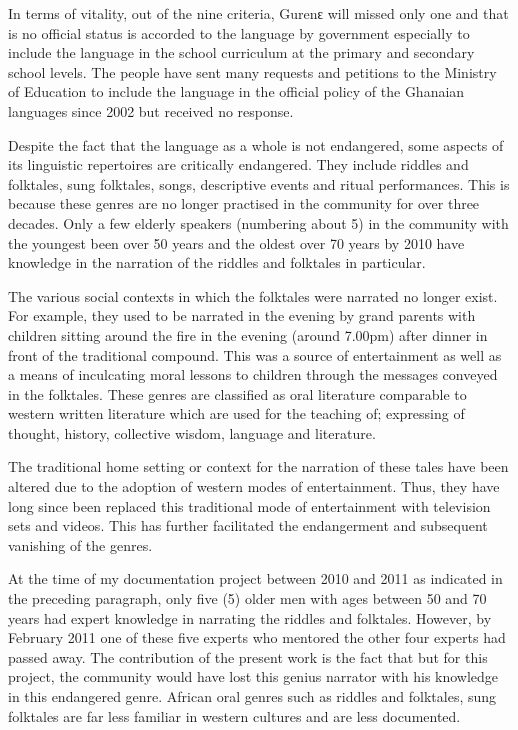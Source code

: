 \documentclass[output=paper,colorlinks,citecolor=brown]{langscibook}
\begin{document}
In terms of vitality, out of the nine criteria, Gurenԑ will missed only one and that is no official status is accorded to the language by government especially to include the language in the school curriculum at the primary and secondary school levels. The people have sent many requests and petitions to the Ministry of Education to include the language in the official policy of the Ghanaian languages since 2002 but received no response.

Despite the fact that the language as a whole is not endangered, some aspects of its linguistic repertoires are critically endangered. They include riddles and folktales, sung folktales, songs, descriptive events and ritual performances. This is because these genres are no longer practised in the community for over three decades. Only a few elderly speakers (numbering about 5) in the community with the youngest been over 50 years and the oldest over 70 years by 2010 have knowledge in the narration of the riddles and folktales in particular. 

The various social contexts in which the folktales were narrated no longer exist. For example, they used to be narrated in the evening by grand parents with children sitting around the fire in the evening (around 7.00pm) after dinner in front of the traditional compound. This was a source of entertainment as well as a means of inculcating moral lessons to children through the messages conveyed in the folktales. These genres are classified as oral literature comparable to western written literature which are used for the teaching of; expressing of thought, history, collective wisdom, language and literature. 

The traditional home setting or context for the narration of these tales have been altered due to the adoption of western modes of entertainment. Thus, they have long since been replaced this traditional mode of entertainment with television sets and videos. This has further facilitated the endangerment and subsequent vanishing of the genres.

At the time of my documentation project between 2010 and 2011 as indicated in the preceding paragraph, only five (5) older men with ages between 50 and 70 years had expert knowledge in narrating the riddles and folktales. However, by February 2011 one of these five experts who mentored the other four experts had passed away. The contribution of the present work is the fact that but for this project, the community would have lost this genius narrator with his knowledge in this endangered genre. African oral genres such as riddles and folktales, sung folktales are far less familiar in western cultures and are less documented. 
\end{document}
